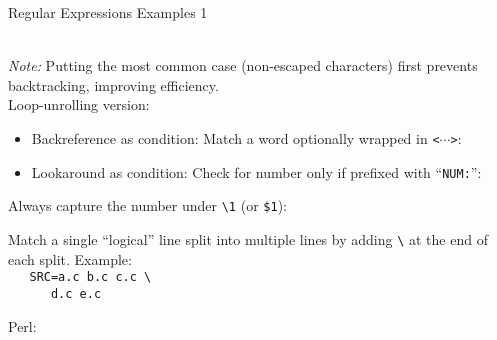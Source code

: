 \documentclass[11pt, a4paper, landscape]{scrartcl}
\newcommand{\regex}[1]{\texttt{#1}}
\newcommand{\code}[1]{\texttt{#1}}
\newcommand{\bs}{\textbackslash}
\begin{document}
\begin{cheatsheet}{Regular Expressions Examples 1}

\begin{col1}


\regex{}\\
\emph{Note:} Putting the most common case (non-escaped characters) first prevents backtracking, improving efficiency.\\
Loop-unrolling version:
\regex{}\\


\begin{itemize}
	\item Backreference as condition: Match a word optionally wrapped in \code{<$\cdots$>}:\\
	\regex{}
	\item Lookaround as condition: Check for number only if prefixed with ``\code{NUM:}'':\\
	\regex{}
\end{itemize}


Always capture the number under \regex{\bs{}1} (or \regex{\$1}):\\
\regex{}


Match a single ``logical'' line split into multiple lines by adding \regex{\bs}
at the end of each split. Example:\\
\texttt{%
\mbox{}\ \ SRC=a.c b.c c.c \bs\\
\mbox{}\ \ \ \ \ \ d.c e.c}

\regex{}

\end{col1}

\begin{col2}


Perl:\\
\regex{}\\



\end{col2}
\end{cheatsheet}
\end{document}
